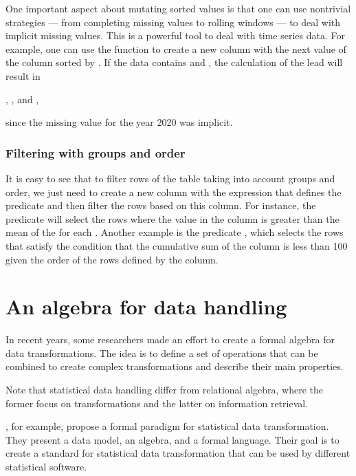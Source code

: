 One important aspect about mutating sorted values is that one can use nontrivial
strategies --- from completing missing values to rolling windows --- to deal with implicit
missing values.  This is a powerful tool to deal with time series data. For example, one
can use the  function to create a new column with the next value of the
 column sorted by .  If the data contains  and
, the calculation of the lead will result in
\begin{center}
  , , and ,
\end{center}
since the missing value for the year 2020 was implicit.

\subsubsection{Filtering with groups and order}

It is easy to see that to filter rows of the table taking into account groups and order,
we just need to create a new column with the expression that defines the predicate and
then filter the rows based on this column.  For instance, the predicate  will select the rows where the value in the  column is greater
than the mean of the  for each . Another example is the predicate
, which selects the rows that satisfy the condition
that the cumulative sum of the  column is less than 100 given the order of the
rows defined by the  column.

\section{An algebra for data handling}

In recent years, some researchers made an effort to create a formal algebra for data
transformations.  The idea is to define a set of operations that can be combined to create
complex transformations and describe their main properties.

Note that statistical data handling differ from relational algebra, where the former focus
on transformations and the latter on information retrieval.

\citeauthor{Song2021}, for example, propose a formal paradigm for statistical data
transformation.  They present a data model, an algebra, and a formal language.  Their goal
is to create a standard for statistical data transformation that can be used by different
statistical software.

